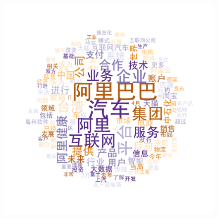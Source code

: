 \documentclass[11pt]{beamer}
\begin{document}
\begin{frame}
\begin{figure}
    \includegraphics[height=0.3\textheight]{plot/Mar-Apr-wordcloud}\\

\end{figure}
\end{frame}
\end{document}
